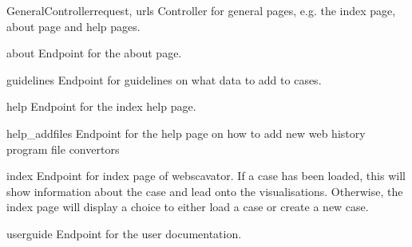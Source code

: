 \documentclass[letterpaper,10pt,english]{manual}
\begin{document}
\hypertarget{webscavator.controllers.generalController.GeneralController}{}\begin{classdesc}{GeneralController}{request, urls}
Controller for general pages, e.g. the index page, about page and help pages.

\hypertarget{webscavator.controllers.generalController.GeneralController.about}{}\begin{methoddesc}{about}{}
Endpoint for the about page.
\end{methoddesc}

\hypertarget{webscavator.controllers.generalController.GeneralController.guidelines}{}\begin{methoddesc}{guidelines}{}
Endpoint for guidelines on what data to add to cases.
\end{methoddesc}

\hypertarget{webscavator.controllers.generalController.GeneralController.help}{}\begin{methoddesc}{help}{}
Endpoint for the index help page.
\end{methoddesc}

\hypertarget{webscavator.controllers.generalController.GeneralController.help_addfiles}{}\begin{methoddesc}{help\_addfiles}{}
Endpoint for the help page on how to add new web history program file convertors
\end{methoddesc}

\hypertarget{webscavator.controllers.generalController.GeneralController.index}{}\begin{methoddesc}{index}{}
Endpoint for index page of webscavator. If a case has been loaded, this will 
show information about the case and lead onto the visualisations. 
Otherwise, the index page will display a choice
to either load a case or create a new case.
\end{methoddesc}

\hypertarget{webscavator.controllers.generalController.GeneralController.userguide}{}\begin{methoddesc}{userguide}{}
Endpoint for the user documentation.
\end{methoddesc}


\end{classdesc}
\end{document}
